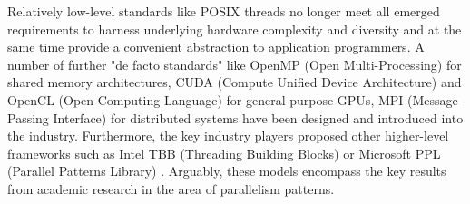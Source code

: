 \quad Relatively low-level standards like POSIX threads \cite{posix_specs} no longer meet all emerged requirements to harness underlying hardware complexity and diversity and at the same time provide a convenient abstraction to application programmers. A number of further "de facto standards" like OpenMP (Open Multi-Processing) \cite{openmp_specs} for shared memory architectures, CUDA (Compute Unified Device Architecture) \cite{cuda} and OpenCL (Open Computing Language) \cite{opencl} for general-purpose GPUs, MPI (Message Passing Interface) \cite{mpi} for distributed systems have been designed and introduced into the industry. Furthermore, the key industry players proposed other higher-level frameworks such as Intel TBB (Threading Building Blocks) \cite{intel-tbb} or Microsoft PPL (Parallel Patterns Library) \cite{microsoft-ppl}. Arguably, these models encompass the key results from academic research in the area of parallelism patterns.
